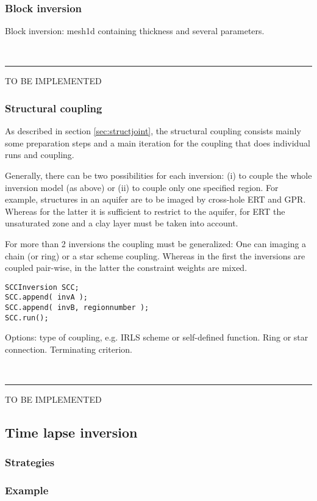 \documentclass[a4paper,DIV12]{scrartcl}
\newcommand{\sperre}{\,\rule{1ex}{2ex}}
\begin{document}
\subsubsection*{Block inversion}
Block inversion: mesh1d containing thickness and several parameters.

\sperre{TO BE IMPLEMENTED}

\subsubsection*{Structural coupling}
As described in section \ref{sec:structjoint}, the structural coupling consists mainly some preparation steps and a main iteration for the coupling that does individual runs and coupling.

Generally, there can be two possibilities for each inversion: (i) to couple the whole inversion model (as above) or (ii) to couple only one specified region.
For example, structures in an aquifer are to be imaged by cross-hole ERT and GPR. Whereas for the latter it is sufficient to restrict to the aquifer, for ERT the unsaturated zone and a clay layer must be taken into account.

For more than 2 inversions the coupling must be generalized: One can imaging a chain (or ring) or a star scheme coupling. 
Whereas in the first the inversions are coupled pair-wise, in the latter the  constraint weights are mixed. 

\begin{lstlisting}
SCCInversion SCC;
SCC.append( invA );
SCC.append( invB, regionnumber );
SCC.run(); 
\end{lstlisting}

Options: type of coupling, e.g. IRLS scheme or self-defined function. Ring or star connection. Terminating criterion.

\sperre{TO BE IMPLEMENTED}

\subsection{Time lapse inversion}\label{sec:timelapse}
\subsubsection*{Strategies}\label{sec:tlstrategies}
\subsubsection*{Example}

 

\begin{appendix}

\end{appendix}
\end{document}
